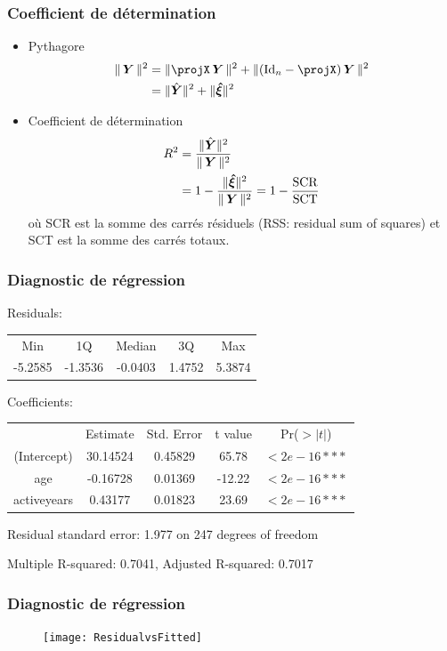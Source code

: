 \begin{frame}
\frametitle{Coefficient de détermination}
\begin{itemize}
\item \alert{Pythagore}
\begin{align*}
\| \bY \|^2 &= \| \projX \bY \|^2 + \| (\Id{n} - \projX) \bY \|^2 \\
            &= \| \predY \|^2 + \| \errpred \|^2
\end{align*}
\item \alert{Coefficient de détermination}
\begin{align*}
R^2 &= \frac{\|\hat{\boldsymbol{Y}}\|^2}{\|\operatorname{\boldsymbol{Y}}\|^2} \\
    &= 1 - \frac{\| \boldsymbol{\hat{\xi}} \|^2}{\|\operatorname{\boldsymbol{Y}}\|^2} = 1 - \frac{\mathrm{SCR}}{\mathrm{SCT}}
\end{align*}
où \alert{SCR} est la somme des carrés résiduels (RSS: residual sum of squares) et \alert{SCT} est la somme des carrés totaux.
\end{itemize}
\end{frame}

\begin{frame}
\frametitle{Diagnostic de régression}

Residuals:
\begin{tabular}{ccccc}
    Min   &   1Q     & Median  &    3Q  &   Max \\
-5.2585   &  -1.3536 & -0.0403 & 1.4752 &  5.3874 \\
\end{tabular}

Coefficients:
\begin{tabular}{ccccc}
                 & Estimate &Std. Error &t value& Pr($>|t|$) \\
(Intercept)      & 30.14524 &   0.45829 &  65.78&   $<2e-16 ***$ \\
age              &-0.16728  &  0.01369  &-12.22 &   $<2e-16 ***$ \\
activeyears      &0.43177   & 0.01823   &23.69  &   $<2e-16 ***$  \\
\end{tabular}

Residual standard error: 1.977 on 247 degrees of freedom

Multiple R-squared:  0.7041,	Adjusted R-squared:  0.7017

\end{frame}




\begin{frame}
\frametitle{Diagnostic de régression}
\begin{figure}
  \centering
  \texttt{[image: ResidualvsFitted]}\\
\end{figure}
\end{frame}



